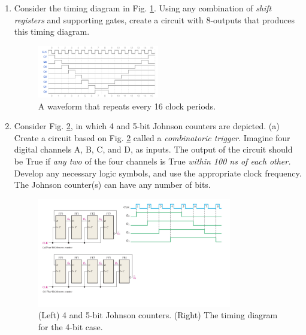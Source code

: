 \documentclass[10pt]{article}
\begin{document}
\begin{enumerate}
\item Consider the timing diagram in Fig. \ref{fig:sr1}.  Using any combination of \textit{shift registers} and supporting gates, create a circuit with 8-outputs that produces this timing diagram.
\begin{figure}[ht]
\centering
\includegraphics[width=0.5\textwidth]{figures/timingExample15.pdf}
\caption{\label{fig:sr1} A waveform that repeats every 16 clock periods.}
\end{figure} \vspace{4cm}
\item Consider Fig. \ref{fig:SRG8}, in which 4 and 5-bit Johnson counters are depicted.  (a) Create a circuit based on Fig. \ref{fig:SRG8} called a \textit{combinatoric trigger.}  Imagine four digital channels A, B, C, and D, as inputs.  The output of the circuit should be True if \textit{any two} of the four channels is True \textit{within 100 ns of each other.}  Develop any necessary logic symbols, and use the appropriate clock frequency.  The Johnson counter(s) can have any number of bits.
\begin{figure}[hb]
\centering
\includegraphics[width=0.8\textwidth]{figures/SRG8.pdf}
\caption{\label{fig:SRG8} (Left) 4 and 5-bit Johnson counters. (Right) The timing diagram for the 4-bit case.}
\end{figure}
\end{enumerate}
\end{document}
